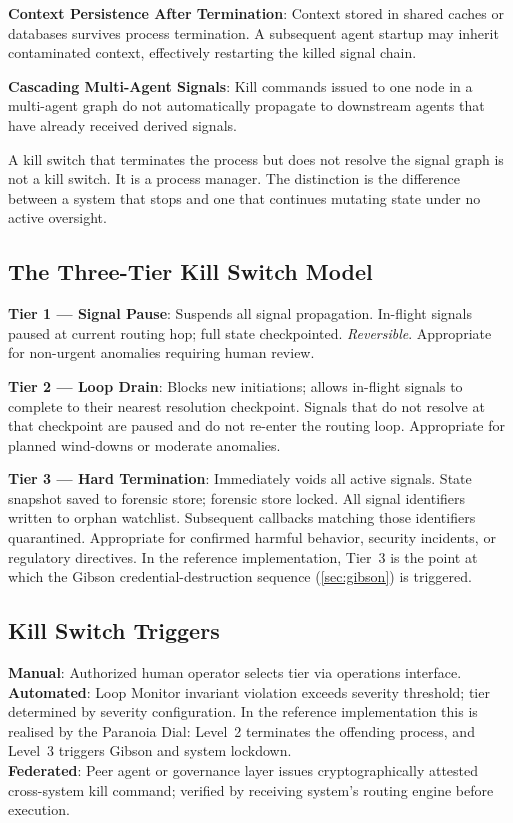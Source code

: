 \documentclass[11pt,a4paper]{article}
\begin{document}
\textbf{Context Persistence After Termination}: Context stored in shared caches or databases
survives process termination. A subsequent agent startup may inherit contaminated context,
effectively restarting the killed signal chain.

\textbf{Cascading Multi-Agent Signals}: Kill commands issued to one node in a multi-agent graph
do not automatically propagate to downstream agents that have already received derived signals.

\begin{warningbox}
A kill switch that terminates the process but does not resolve the signal graph is not a kill
switch. It is a process manager. The distinction is the difference between a system that stops
and one that continues mutating state under no active oversight.
\end{warningbox}

\subsection{The Three-Tier Kill Switch Model}

\textbf{Tier 1 --- Signal Pause}: Suspends all signal propagation. In-flight signals paused at
current routing hop; full state checkpointed. \emph{Reversible}. Appropriate for non-urgent
anomalies requiring human review.

\textbf{Tier 2 --- Loop Drain}: Blocks new initiations; allows in-flight signals to complete to
their nearest resolution checkpoint. Signals that do not resolve at that checkpoint are paused
and do not re-enter the routing loop. Appropriate for planned wind-downs or moderate anomalies.

\textbf{Tier 3 --- Hard Termination}: Immediately voids all active signals. State snapshot saved
to forensic store; forensic store locked. All signal identifiers written to orphan watchlist.
Subsequent callbacks matching those identifiers quarantined. Appropriate for confirmed harmful
behavior, security incidents, or regulatory directives. In the reference implementation, Tier~3
is the point at which the Gibson credential-destruction sequence (\cref{sec:gibson}) is triggered.

\subsection{Kill Switch Triggers}

\textbf{Manual}: Authorized human operator selects tier via operations interface.\\
\textbf{Automated}: Loop Monitor invariant violation exceeds severity threshold; tier determined
by severity configuration. In the reference implementation this is realised by the Paranoia Dial:
Level~2 terminates the offending process, and Level~3 triggers Gibson and system lockdown.\\
\textbf{Federated}: Peer agent or governance layer issues cryptographically attested cross-system
kill command; verified by receiving system's routing engine before execution.
\end{document}
